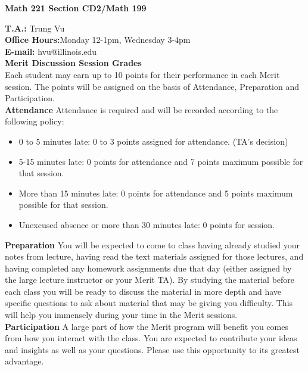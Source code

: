 \documentclass[12pt]{article}
\begin{document}
\begin{center}
\textbf{Math 221 Section CD2/Math 199}
\end{center}

\noindent \textbf{T.A.:} Trung Vu\\				
\textbf{Office Hours:}Monday 12-1pm, Wednesday 3-4pm\\
\textbf{E-mail:} hvu@illinois.edu\\

\noindent \textbf{Merit Discussion Session Grades}\\
Each student may earn up to 10 points for their performance in each Merit session. The points will be assigned on the basis of Attendance, Preparation and Participation.\\
\textbf{Attendance} Attendance is required and will be recorded according to the following policy:
\begin{itemize}
  \item 0 to 5 minutes late: 0 to 3 points assigned for attendance. (TA's decision)
  \item 5-15 minutes late: 0 points for attendance and 7 points maximum possible for that session.
  \item More than 15 minutes late: 0 points for attendance and 5 points maximum possible for that session.
  \item Unexcused absence or more than 30 minutes late: 0 points for session.
\end{itemize}
\textbf{Preparation} You will be expected to come to class having already studied your notes from lecture, having read the text materials assigned for those lectures, and having completed any homework assignments due that day (either assigned by the large lecture instructor or your Merit TA). By studying the material before each class you will be ready to discuss the material in more depth and have specific questions to ask about material that may be giving you difficulty. This will help you immensely during your time in the Merit sessions.\\
\textbf{Participation}  A large part of how the Merit program will benefit you comes from how you interact with the class.  You are expected to contribute your ideas and insights as well as your questions.  Please use this opportunity to its greatest advantage.\\
\end{document}
